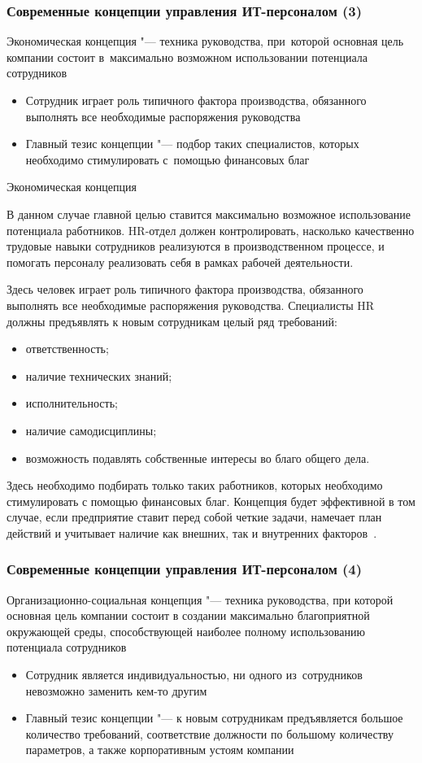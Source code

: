 \documentclass{../industrial-development}
\begin{document}
\begin{frame} \frametitle{Современные концепции управления ИТ-персоналом (3)}
	
	\alert{Экономическая концепция} "--- техника руководства, при~которой основная цель компании состоит в~максимально возможном использовании потенциала сотрудников
	\begin{itemize}
		\item Сотрудник играет роль типичного фактора производства, обязанного выполнять все необходимые распоряжения руководства
		\item Главный тезис концепции "--- подбор таких специалистов, которых необходимо стимулировать с~помощью финансовых благ
	\end{itemize}
\end{frame}

\lecturenotes

\alert{Экономическая концепция}

В данном случае главной целью ставится максимально возможное использование потенциала работников. HR-отдел должен контролировать, насколько качественно трудовые навыки сотрудников реализуются в производственном процессе, и помогать персоналу реализовать себя в рамках рабочей деятельности.

Здесь человек играет роль типичного фактора производства, обязанного выполнять все необходимые распоряжения руководства. Специалисты HR должны предъявлять к новым сотрудникам целый ряд требований:
\begin{itemize}
	\item ответственность;
	\item	наличие технических знаний;
	\item	исполнительность;
	\item	наличие самодисциплины;
	\item	возможность подавлять собственные интересы во благо общего дела.
\end{itemize}

Здесь необходимо подбирать только таких работников, которых необходимо стимулировать с помощью финансовых благ. Концепция будет эффективной в том случае, если предприятие ставит перед собой четкие задачи, намечает план действий и учитывает наличие как внешних, так и внутренних факторов~\cite{Sovrconcept}. 

\begin{frame} \frametitle{Современные концепции управления ИТ-персоналом (4)}
	\alert{Организационно-социальная концепция} "--- техника руководства, при которой основная цель компании состоит в создании максимально благоприятной окружающей среды, способствующей наиболее полному использованию потенциала сотрудников
	\begin{itemize}
		\item Сотрудник является индивидуальностью, ни одного из~сотрудников невозможно заменить кем-то другим
		\item Главный тезис концепции "---  к новым сотрудникам предъявляется большое количество требований, соответствие должности по большому количеству параметров, а также корпоративным устоям компании
	\end{itemize}
\end{frame}
\end{document}
